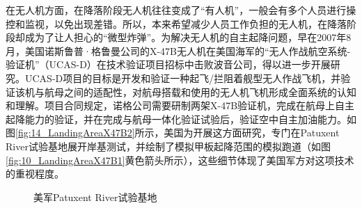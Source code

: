 在无人机方面，在降落阶段无人机往往变成了“有人机”，一般会有多个人员进行操控和监视，以免出现差错。所以，本来希望减少人员工作负担的无人机，在降落阶段却成为了让人担心的“微型炸弹”。为解决无人机的自主起降问题，早在2007年8月，美国诺斯鲁普·格鲁曼公司的X-47B无人机在美国海军的“无人作战航空系统-验证机”（UCAS-D）在技术验证项目招标中击败波音公司，得以进一步开展研究。UCAS-D项目的目标是开发和验证一种起飞/拦阻着舰型无人作战飞机，并验证该机与航母之间的适配性，对航母搭载和使用的无人机飞机形成全面系统的认知和理解。项目合同规定，诺格公司需要研制两架X-47B验证机，完成在航母上自主起降能力的验证，并在完成与航母一体化验证试验后，验证空中自主加油能力。如图\ref{fig:14_LandingAreaX47B2}所示，美国为开展这方面研究，专门在Patuxent River试验基地展开岸基测试，并绘制了模拟甲板起降范围的模拟跑道（如图\ref{fig:10_LandingAreaX47B1}黄色箭头所示），这些细节体现了美国军方对这项技术的重视程度。
\begin{figure}[htb]
	\centering%
	\hspace{0.7em}%
	\caption{美军Patuxent River试验基地}
	\label{fig:14_LandingAreaX47B}
\end{figure}

